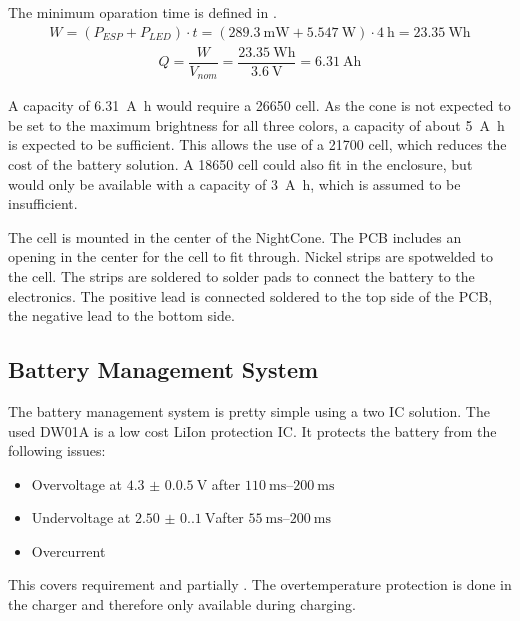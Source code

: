 The minimum oparation time is defined in . 
\begin{align}
    W = \left(P_{ESP} + P_{LED}\right) \cdot t = \left(\SI{289.3}{\milli\watt} + \SI{5.547}{\watt}\right) \cdot \SI{4}{\hour} = \SI{23.35}{\watt\hour}
\end{align}
\begin{align}
    Q = \dfrac{W}{V_{nom}} = \dfrac{\SI{23.35}{\watt\hour}}{\SI{3.6}{\volt}} = \SI{6.31}{\ampere\hour}
\end{align}

A capacity of \SI{6.31}{\ampere\hour} would require a 26650 cell. As the cone is not expected to be set to the maximum brightness for all three colors, a capacity of about \SI{5}{\ampere\hour} is expected to be sufficient. This allows the use of a 21700 cell, which reduces the cost of the battery solution. A 18650 cell could also fit in the enclosure, but would only be available with a capacity of \SI{3}{\ampere\hour}, which is assumed to be insufficient. 

The cell is mounted in the center of the NightCone. The \ac{PCB} includes an opening in the center for the cell to fit through. Nickel strips are spotwelded to the cell. The strips are soldered to solder pads to connect the battery to the electronics. The positive lead is connected soldered to the top side of the \ac{PCB}, the negative lead to the bottom side. 

\subsection{Battery Management System}
\label{sec_bms}
The battery management system is pretty simple using a two IC solution. The used DW01A \cite{Puolop:DW01A} is a low cost \ac{LiIon} protection IC. It protects the battery from the following issues: 
\begin{itemize}
	\item Overvoltage at $\SI[separate-uncertainty=true,multi-part-units=single]{4.3(0.05)}{\V}$  after $\qtyrange{110}{200}{\ms}$
	\item Undervoltage at $\SI[separate-uncertainty=true,multi-part-units=single]{2.50(0.10)}{\V}$after $\qtyrange{55}{200}{\ms}$
	\item Overcurrent
\end{itemize}
This covers requirement  and partially . The overtemperature protection is done in the charger and therefore only available during charging. 

